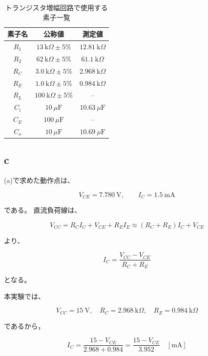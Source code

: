 \documentclass[11pt,a4paper]{jsarticle}
\begin{document}
\begin{table}[H]
\centering
\caption{トランジスタ増幅回路で使用する素子一覧}
\label{tab:parts}
\begin{tabular}{ccc}
\toprule
素子名 & 公称値 & 測定値 \\
\midrule
$R_1$ & $13~\mathrm{k}\Omega\pm 5 \% $ & $12.81~\mathrm{k}\Omega$\\
$R_2$ & $62~\mathrm{k}\Omega\pm 5 \% $ & $61.1~\mathrm{k}\Omega$ \\
$R_C$ & $3.0~\mathrm{k}\Omega\pm 5 \% $ & $2.968~\mathrm{k}\Omega$ \\
$R_E$ & $1.0~\mathrm{k}\Omega\pm 5 \% $ & $0.984~\mathrm{k}\Omega $\\
$R_L$ & $100~\mathrm{k}\Omega\pm 5 \% $ & -- \\
$C_i$ & $10~\mu \mathrm{F}$ & $10.63~\mu \mathrm{F}$ \\
$C_E$ & $100~\mu \mathrm{F}$ & -- \\
$C_o$ & $10~\mu \mathrm{F}$ & $10.69~\mu \mathrm{F}$ \\
\bottomrule
\end{tabular}
\end{table}



\subsection{c}

(a)で求めた動作点は、

\[
V_{CE}=7.780~\mathrm{V},\qquad
I_C=1.5~\mathrm{mA}
\]

である。
直流負荷線は、

\begin{equation}
V_{CC}=R_CI_C+V_{CE}+R_EI_E
      \approx (R_C+R_E)I_C+V_{CE}
\end{equation}

より、

\begin{equation}
I_C=\frac{V_{CC}-V_{CE}}{R_C+R_E}
\end{equation}

となる。

本実験では、

\[
V_{CC}=15~\mathrm{V},\quad
R_C=2.968~\mathrm{k}\Omega,\quad
R_E=0.984~\mathrm{k}\Omega
\]

であるから，

\begin{equation}
I_C
=
\frac{15-V_{CE}}
{2.968+0.984}
=
\frac{15-V_{CE}}
{3.952}
\quad[\mathrm{mA}]
\end{equation}
\end{document}
